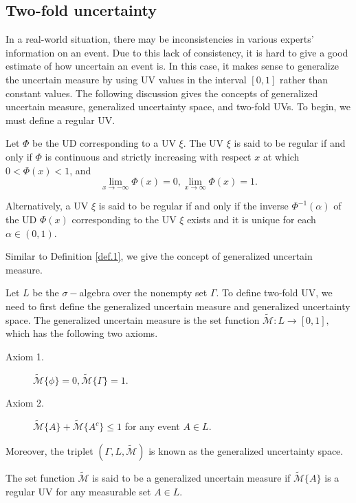 \subsection{Two-fold uncertainty} In a real-world situation, there may be inconsistencies in various experts' information on an event. Due to this lack of consistency, it is hard to give a good estimate of how uncertain an event is. In this case, it makes sense to generalize the uncertain measure by using UV values in the interval $[0, 1]$ rather than constant values. The following discussion gives the concepts of generalized uncertain measure, generalized uncertainty space, and two-fold UVs. To begin, we must define a regular UV.
\begin{definition}\cite{Liu 2015}\label{def.7}
	Let $\Phi$ be the UD corresponding to a UV $\xi$.
	The UV $\xi$ is said to be regular if and only if $\Phi$ is continuous and strictly increasing with respect $x$ at which $0<\Phi(x)<1$, and $$\lim\limits_{x\to -\infty}\Phi(x)=0, \lim\limits_{x\to \infty}\Phi(x)=1.$$
	\par Alternatively, a UV $\xi$ is said to be regular if and only if the inverse $\Phi^{-1}(\alpha)$ of the UD $\Phi(x)$ corresponding to the UV $\xi$ exists and it is unique for each $\alpha \in (0,1)$.
\end{definition} 
Similar to Definition \ref{def.1}, we give the concept of generalized uncertain measure.
\begin{definition}\cite{Yang 2015}\label{def.8}
Let $L$ be the $\sigma-$algebra over the nonempty set $\Gamma$. To define two-fold UV, we need to first define the generalized uncertain measure and generalized uncertainty space. The generalized uncertain measure is the set function $\mathcal{\tilde{M}}:L\rightarrow[0,1],$ which has the following two axioms.
\begin{description}
	\item[ Axiom 1.] $\mathcal{\tilde{M}}\{\phi\}=0,\mathcal{\tilde{M}}\{\Gamma\}=1$.
	\item[Axiom 2.] $\mathcal{\tilde{M}}\{A\}+\mathcal{\tilde{M}}\{A^c\}\leq1$ for any event $A\in L$.
\end{description}
\par Moreover, the triplet $(\Gamma,L,\mathcal{\tilde{M}})$ is known as the generalized uncertainty space.
\end{definition} 
\begin{remark}\cite{Yang 2015}
	The set function $\mathcal{\tilde{M}}$ is said to be a generalized uncertain measure if $\mathcal{\tilde{M}}\{A\}$ is a regular UV for any measurable set $A\in L$.
	\end{remark}
